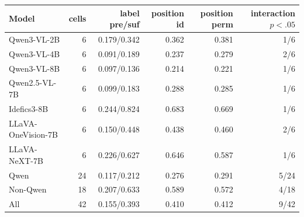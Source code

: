 \begin{tabular}{lrrrrr}
\toprule
Model & cells & label pre/suf & position id & position perm & interaction $p<.05$ \\
\midrule
Qwen3-VL-2B & 6 & 0.179/0.342 & 0.362 & 0.381 & 1/6 \\
Qwen3-VL-4B & 6 & 0.091/0.189 & 0.237 & 0.279 & 2/6 \\
Qwen3-VL-8B & 6 & 0.097/0.136 & 0.214 & 0.221 & 1/6 \\
Qwen2.5-VL-7B & 6 & 0.099/0.183 & 0.288 & 0.285 & 1/6 \\
Idefics3-8B & 6 & 0.244/0.824 & 0.683 & 0.669 & 1/6 \\
LLaVA-OneVision-7B & 6 & 0.150/0.448 & 0.438 & 0.460 & 2/6 \\
LLaVA-NeXT-7B & 6 & 0.226/0.627 & 0.646 & 0.587 & 1/6 \\
\midrule
Qwen & 24 & 0.117/0.212 & 0.276 & 0.291 & 5/24 \\
\midrule
Non-Qwen & 18 & 0.207/0.633 & 0.589 & 0.572 & 4/18 \\
\midrule
All & 42 & 0.155/0.393 & 0.410 & 0.412 & 9/42 \\
\bottomrule
\end{tabular}

